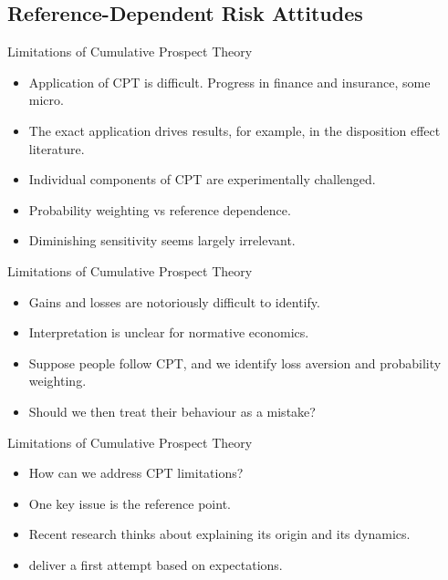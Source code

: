 \documentclass[11pt, aspectratio=169]{beamer}
\begin{document}
\subsection{Reference-Dependent Risk Attitudes}


\begin{frame}{Limitations of Cumulative Prospect Theory}
 \begin{itemize}
 \item Application of CPT is difficult. Progress in finance and insurance, some micro.\medskip
 \item The exact application drives results, for example, in the disposition effect literature.\medskip
 \item Individual components of CPT are experimentally challenged.\medskip
 \item Probability weighting vs reference dependence.\medskip
 \item Diminishing sensitivity seems largely irrelevant.\medskip
 \end{itemize}
\end{frame}

\begin{frame}{Limitations of Cumulative Prospect Theory}
 \begin{itemize}
 \item Gains and losses are notoriously difficult to identify.\medskip
 \item Interpretation is unclear for normative economics.\medskip
 \item Suppose people follow CPT, and we identify loss aversion and probability weighting.\medskip
 \item Should we then treat their behaviour as a mistake?\medskip
 \end{itemize}
\end{frame}

\begin{frame}{Limitations of Cumulative Prospect Theory}
 \begin{itemize}
 \item How can we address CPT limitations?\medskip
 \item One key issue is the reference point.\medskip
 \item Recent research thinks about explaining its origin and its dynamics.\medskip
     \item \citet{KoeszegiRabin2006, KoeszegiRabin2007} deliver a first attempt based on expectations.\medskip
 \end{itemize}
\end{frame}
\end{document}
